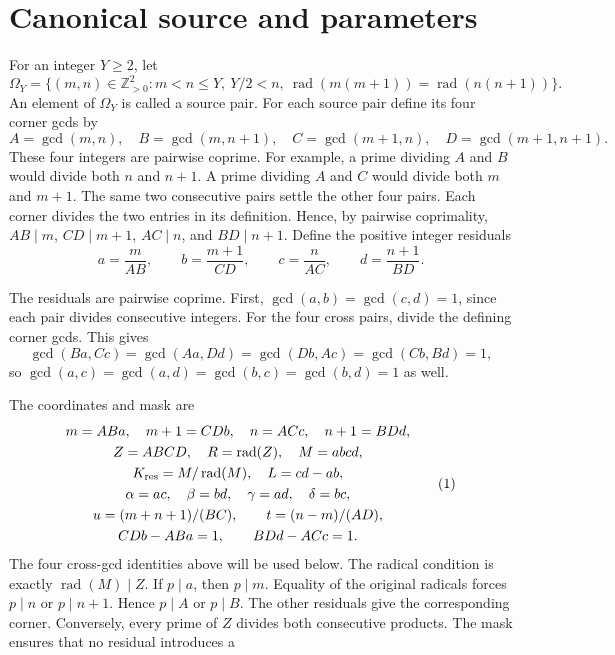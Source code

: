 \section{Canonical source and parameters}\label{sec:notation}

For an integer \(Y\ge2\), let
\[
 \Omega_Y=\{(m,n)\in\mathbb Z_{>0}^2:
       m<n\le Y,\ Y/2<n,\
       \operatorname{rad}(m(m+1))=\operatorname{rad}(n(n+1))\}.
\]
An element of \(\Omega_Y\) is called a source pair.
For each source pair define its four corner gcds by
\[
A=\gcd(m,n),\quad B=\gcd(m,n+1),\quad
C=\gcd(m+1,n),\quad D=\gcd(m+1,n+1).
\]
These four integers are pairwise coprime. For example, a prime dividing
\(A\) and \(B\) would divide both \(n\) and \(n+1\). A prime
dividing \(A\) and \(C\) would divide both \(m\) and \(m+1\). The
same two consecutive pairs settle the other four pairs. Each corner
divides the two entries in its definition. Hence, by pairwise
coprimality, \(AB\mid m\), \(CD\mid m+1\), \(AC\mid n\), and \(BD\mid n+1\).
Define the positive integer residuals
\[
a=\frac m{AB},\qquad b=\frac{m+1}{CD},\qquad
c=\frac n{AC},\qquad d=\frac{n+1}{BD}.
\]
\begin{samepage}
The residuals are pairwise coprime. First, \(\gcd(a,b)=\gcd(c,d)=1\),
since each pair divides consecutive integers. For the four cross pairs,
divide the defining corner gcds. This gives
\[
\gcd(Ba,Cc)=\gcd(Aa,Dd)=\gcd(Db,Ac)=\gcd(Cb,Bd)=1,
\]
so \(\gcd(a,c)=\gcd(a,d)=\gcd(b,c)=\gcd(b,d)=1\) as well.
\end{samepage}
The coordinates and mask are
\[
\begin{gathered}
m=ABa,\quad m+1=CDb,\quad n=ACc,\quad n+1=BDd,\\
Z=ABCD,\quad R=\operatorname{rad}(Z),\quad M=abcd,\\
K_{\rm res}=M/\operatorname{rad}(M),\quad L=cd-ab,\\
\alpha=ac,\quad\beta=bd,\quad\gamma=ad,\quad\delta=bc,\\
u=(m+n+1)/(BC),\qquad t=(n-m)/(AD),\\
CDb-ABa=1,\qquad BDd-ACc=1.
\end{gathered}\AutoTag{eq:old:2_1}
\]
The four cross-gcd identities above will be used below. The radical
condition is exactly \(\operatorname{rad}(M)\mid Z\). If \(p\mid a\), then
\(p\mid m\). Equality of the original radicals forces \(p\mid n\) or
\(p\mid n+1\). Hence \(p\mid A\) or \(p\mid B\). The other residuals give
the corresponding corner. Conversely, every prime of \(Z\) divides both
consecutive products. The mask ensures that no residual introduces a
